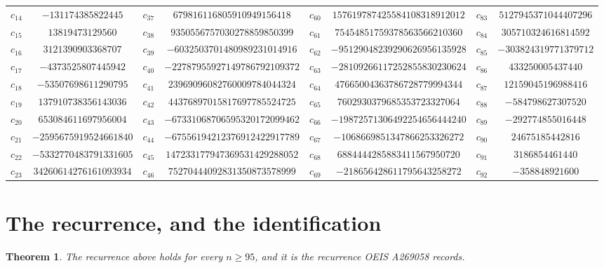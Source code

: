 \documentclass[11pt,a4paper]{article}
\theoremstyle{plain}
\newtheorem{theorem}{Theorem}
\theoremstyle{definition}
\begin{document}
\begin{center}
\begin{tabular}{cccccccc}
$c_{14}$ & $-131174385822445$ & $c_{37}$ & $679816116805910949156418$ & $c_{60}$ & $157619787425584108318912012$ & $c_{83}$ & $5127945371044407296$ \\
$c_{15}$ & $13819473129560$ & $c_{38}$ & $9350556757030278859850399$ & $c_{61}$ & $75454851759378563566210360$ & $c_{84}$ & $305710324616814592$ \\
$c_{16}$ & $3121390903368707$ & $c_{39}$ & $-6032503701480989231014916$ & $c_{62}$ & $-95129048239290626956135928$ & $c_{85}$ & $-303824319771379712$ \\
$c_{17}$ & $-4373525807445942$ & $c_{40}$ & $-22787955927149786792109372$ & $c_{63}$ & $-28109266117252855830230624$ & $c_{86}$ & $433250005437440$ \\
$c_{18}$ & $-53507698611290795$ & $c_{41}$ & $23969096082760009784044324$ & $c_{64}$ & $47665004363786728779994344$ & $c_{87}$ & $12159045196988416$ \\
$c_{19}$ & $137910738356143036$ & $c_{42}$ & $44376897015817697785524725$ & $c_{65}$ & $7602930379685353723327064$ & $c_{88}$ & $-584798627307520$ \\
$c_{20}$ & $653084611697956004$ & $c_{43}$ & $-67331068706595320172099462$ & $c_{66}$ & $-19872571306492254656444240$ & $c_{89}$ & $-292774855016448$ \\
$c_{21}$ & $-2595675919524661840$ & $c_{44}$ & $-67556194212376912422917789$ & $c_{67}$ & $-1068669851347866253326272$ & $c_{90}$ & $24675185442816$ \\
$c_{22}$ & $-5332770483791331605$ & $c_{45}$ & $147233177947369531429288052$ & $c_{68}$ & $6884444285883411567950720$ & $c_{91}$ & $3186854461440$ \\
$c_{23}$ & $34260614276161093934$ & $c_{46}$ & $75270444092831350873578999$ & $c_{69}$ & $-218656428611795643258272$ & $c_{92}$ & $-358848921600$ \\
\end{tabular}
\end{center}

\section{The recurrence, and the identification}

\begin{theorem}
The recurrence above holds for every $n\ge95$, and it is the recurrence OEIS A269058 records.
\end{theorem}
\end{document}
